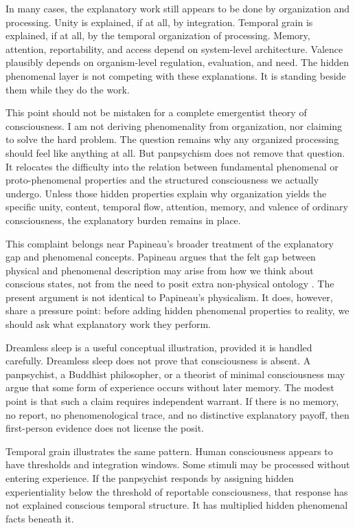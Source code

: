 \documentclass[12pt]{article}
\begin{document}
In many cases, the explanatory work still appears to be done by organization and processing. Unity is explained, if at all, by integration. Temporal grain is explained, if at all, by the temporal organization of processing. Memory, attention, reportability, and access depend on system-level architecture. Valence plausibly depends on organism-level regulation, evaluation, and need. The hidden phenomenal layer is not competing with these explanations. It is standing beside them while they do the work.

This point should not be mistaken for a complete emergentist theory of consciousness. I am not deriving phenomenality from organization, nor claiming to solve the hard problem. The question remains why any organized processing should feel like anything at all. But panpsychism does not remove that question. It relocates the difficulty into the relation between fundamental phenomenal or proto-phenomenal properties and the structured consciousness we actually undergo. Unless those hidden properties explain why organization yields the specific unity, content, temporal flow, attention, memory, and valence of ordinary consciousness, the explanatory burden remains in place.

This complaint belongs near Papineau's broader treatment of the explanatory gap and phenomenal concepts. Papineau argues that the felt gap between physical and phenomenal description may arise from how we think about conscious states, not from the need to posit extra non-physical ontology \citep{papineau2002}. The present argument is not identical to Papineau's physicalism. It does, however, share a pressure point: before adding hidden phenomenal properties to reality, we should ask what explanatory work they perform.

Dreamless sleep is a useful conceptual illustration, provided it is handled carefully. Dreamless sleep does not prove that consciousness is absent. A panpsychist, a Buddhist philosopher, or a theorist of minimal consciousness may argue that some form of experience occurs without later memory. The modest point is that such a claim requires independent warrant. If there is no memory, no report, no phenomenological trace, and no distinctive explanatory payoff, then first-person evidence does not license the posit.

Temporal grain illustrates the same pattern. Human consciousness appears to have thresholds and integration windows. Some stimuli may be processed without entering experience. If the panpsychist responds by assigning hidden experientiality below the threshold of reportable consciousness, that response has not explained conscious temporal structure. It has multiplied hidden phenomenal facts beneath it.
\end{document}

